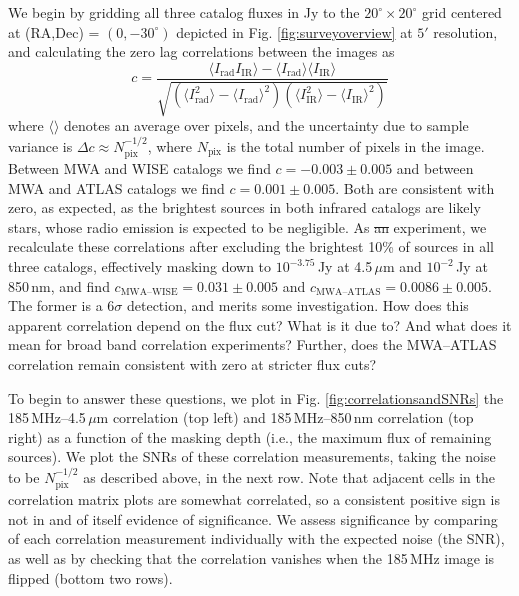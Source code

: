 \documentclass[numberedappendix]{emulateapj}
\newcommand{\rad}{\text{rad}}
\newcommand{\IR}{\text{IR}}
\providecommand{\DIFadd}[1]{{\protect\color{blue}\uwave{#1}}} %
\providecommand{\DIFdel}[1]{{\protect\color{red}\sout{#1}}}                      %
\providecommand{\DIFaddbegin}{} %
\providecommand{\DIFaddend}{} %
\providecommand{\DIFdelbegin}{} %
\providecommand{\DIFdelend}{} %
\begin{document}
We begin by gridding all three catalog fluxes in Jy to the $20^\circ\times20^\circ$ grid centered at (RA,Dec) = $(0, -30^\circ)$ depicted in Fig. \ref{fig:surveyoverview} at $5'$ resolution, and calculating the zero lag correlations between the images as
\begin{equation}
\label{eqn:imagecorrdef}
	c = \frac{\langle I_\rad I_\IR\rangle-\langle I_\rad\rangle\langle I_\IR\rangle}{\sqrt{(\langle I_\rad^2\rangle -\langle I_\rad\rangle^2)(\langle I_\IR^2\rangle -\langle I_\IR\rangle^2)}}
\end{equation}
where $\langle\rangle$ denotes an average over pixels, and the uncertainty due to sample variance is $\Delta c\approx N_\text{pix}^{-1/2}$, where $N_\text{pix}$ is the total number of pixels in the image. Between MWA and WISE catalogs we find $c=-0.003\pm0.005$ and between MWA and ATLAS catalogs we find $c=0.001\pm0.005$. Both are consistent with zero, as expected, as the brightest sources in both infrared catalogs are likely stars, whose radio emission is expected to be negligible. As \DIFdelbegin \DIFdel{an }\DIFdelend \DIFaddbegin \DIFadd{a first }\DIFaddend experiment, we recalculate these correlations after excluding the brightest 10\% of sources in all three catalogs, effectively masking down to $10^{-3.75}$\,Jy at 4.5\,$\mu$m and $10^{-2}$\,Jy at 850\,nm, and find $c_\text{MWA--WISE}=0.031\pm0.005$ and $c_\text{MWA--ATLAS}=0.0086\pm0.005$. The former is a $6\sigma$ detection, and merits some investigation. How does this apparent correlation depend on the flux cut? What is it due to? And what does it mean for broad band correlation experiments? Further, does the MWA--ATLAS correlation remain consistent with zero at stricter flux cuts?

To begin to answer these questions, we plot in Fig. \ref{fig:correlationsandSNRs} the 185\,MHz--4.5\,$\mu$m correlation (top left) and 185\,MHz--850\,nm correlation (top right) as a function of the masking depth (i.e., the maximum flux of remaining sources). We plot the SNRs of these correlation measurements, taking the noise to be $N_\text{pix}^{-1/2}$ as described above, in the next row. Note that adjacent cells in the correlation matrix plots are somewhat correlated, so a consistent positive sign is not in and of itself evidence of significance. We assess significance by comparing of each correlation measurement individually with the expected noise (the SNR), as well as by checking that the correlation vanishes when the 185\,MHz image is flipped (bottom two rows). 
\end{document}
